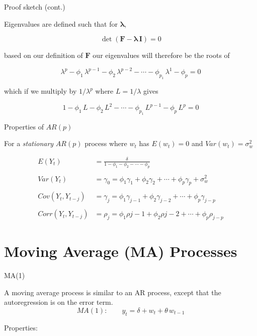 \documentclass[11pt,ignorenonframetext,]{beamer}
\begin{document}
\begin{frame}{Proof sketch (cont.)}

Eigenvalues are defined such that for \(\bm \lambda\),

\[ \det (\bm{F}-\bm\lambda\,\bm{I}) = 0\]

based on our definition of \(\bm F\) our eigenvalues will therefore be
the roots of

\[\lambda^p -\phi_1\,\lambda^{p-1}-\phi_2\,\lambda^{p-2} - \cdots - \phi_{p_1} \, \lambda^1 - \phi_p = 0\]

\pause

which if we multiply by \(1/\lambda^p\) where \(L = 1/\lambda\) gives

\[1 -\phi_1\,L-\phi_2\,L^2 - \cdots - \phi_{p_1} \, L^{p-1} - \phi_p \, L^p = 0\]

\end{frame}

\begin{frame}{Properties of \(AR(p)\)}

For a \emph{stationary} \(AR(p)\) process where \(w_t\) has
\(E(w_t) = 0\) and \(Var(w_t) = \sigma_w^2\)

\[ 
\begin{aligned}
E(Y_t) &= \frac{\delta}{1-\phi_1 -\phi_2-\cdots-\phi_p} \\
\\
Var(Y_t) &= \gamma_0 = \phi_1\gamma_1 + \phi_2\gamma_2 + \cdots + \phi_p\gamma_p + \sigma_w^2 \\
\\
Cov(Y_t,Y_{t-j}) &= \gamma_j = \phi_1\gamma_{j-1} + \phi_2\gamma_{j-2} + \cdots + \phi_p\gamma_{j-p} \\
\\
Corr(Y_t,Y_{t-j}) &= \rho_j = \phi_1\rho{j-1} + \phi_2\rho{j-2} + \cdots + \phi_p\rho_{j-p}
\end{aligned}
\]

\end{frame}

\section{Moving Average (MA)
Processes}\label{moving-average-ma-processes}

\begin{frame}[t]{MA(1)}

A moving average process is similar to an AR process, except that the
autoregression is on the error term.
\[ MA(1): \qquad y_t = \delta + w_t + \theta \, w_{t-1} \]

Properties:

\end{frame}
\end{document}
